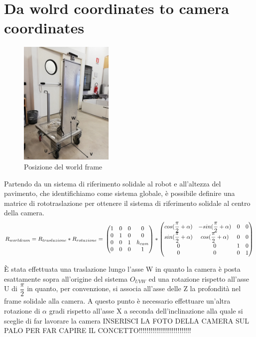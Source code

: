 \section{Da wolrd coordinates to camera coordinates}
\begin{figure}[H]
	\centering
	\includegraphics[width=0.4\textwidth]{Immagini/SupportoCamera_asse1.jpg}
	\caption{Posizione del world frame}
	\label{fig:worldframe}
\end{figure}

Partendo da un sistema di riferimento solidale al robot e all'altezza del pavimento, che identifichiamo come sistema globale, è possibile definire una matrice di rototraslazione per ottenere il sistema di riferimento solidale al centro della camera.
\begin{equation*}
R_{worldcam} = R_{traslazione}*R_{rotazione} =\\
\begin{pmatrix}
1 & 0 & 0 & 0 \\
0 & 1 & 0 & 0 \\
0 & 0 & 1 & h_{cam} \\
0 & 0 & 0 & 1 \\
\end{pmatrix}*
\begin{pmatrix}
cos(\dfrac{\pi}{2}+\alpha) & -sin(\dfrac{\pi}{2}+\alpha) & 0 & 0 \\
sin(\dfrac{\pi}{2}+\alpha) & cos(\dfrac{\pi}{2}+\alpha)& 0 & 0 \\
0 & 0 & 1 & 0 \\
0 & 0 & 0 & 1 \\
\end{pmatrix}
\end{equation*}

È stata effettuata una traslazione lungo l'asse W in quanto la camera è posta esattamente sopra all'origine del sistema $O_{UVW}$ ed una rotazione rispetto all'asse U di $ \dfrac{\pi}{2}$ in quanto, per convenzione, si associa all'asse delle Z la profondità nel frame solidale alla camera.
A questo punto è necessario effettuare un'altra rotazione di $\alpha$ gradi rispetto all'asse X a seconda dell'inclinazione alla quale si sceglie di far lavorare la camera
INSERISCI LA FOTO DELLA CAMERA SUL PALO PER FAR CAPIRE IL CONCETTO!!!!!!!!!!!!!!!!!!!!!!!!!!!

